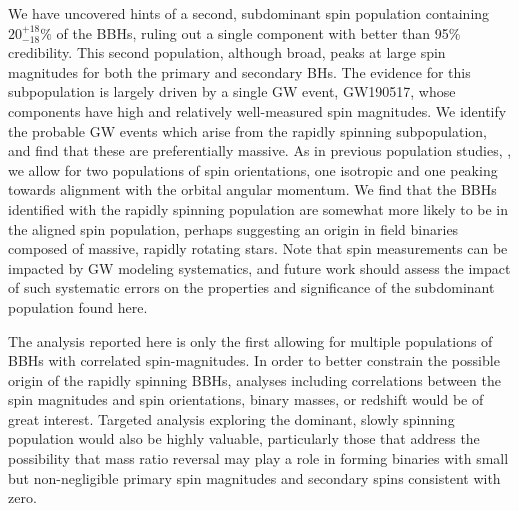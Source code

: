 \documentclass[twocolumn,usenames,dvipsnames,linenumbers]{aastex631}
\newcommand{\rapidspinpercent}{\ensuremath{20^{+18}_{-18} \%}\xspace}
\begin{document}
We have uncovered hints of a second, subdominant spin population containing \rapidspinpercent of the \acp{BBH}, ruling out a single component with better than 95\% credibility.
This second population, although broad, peaks at large spin magnitudes for both the primary and secondary \acp{BH}.
The evidence for this subpopulation is largely driven by a single \ac{GW} event, GW190517, whose components have high and relatively well-measured spin magnitudes.
We identify the probable \ac{GW} events which arise from the rapidly spinning subpopulation, and find that these are preferentially massive.
As in previous population studies, \cite[e.g.][]{KAGRA:2021duu}, we allow for two populations of spin orientations, one isotropic and one peaking towards alignment with the orbital angular momentum.
We find that the \acp{BBH} identified with the rapidly spinning population are somewhat more likely to be in the aligned spin population,
perhaps suggesting an origin in field binaries composed of massive, rapidly rotating stars.
Note that spin measurements can be impacted by \ac{GW} modeling systematics, and future work should assess the impact of such systematic errors on the properties and significance of the subdominant population found here.

The analysis reported here is only the first allowing for multiple populations of \acp{BBH} with correlated spin-magnitudes.
In order to better constrain the possible origin of the rapidly spinning \acp{BBH}, analyses including correlations between the spin magnitudes and spin orientations, binary masses, or redshift would be of great interest.
Targeted analysis exploring the dominant, slowly spinning population would also be highly valuable, particularly those 
that address the possibility that mass ratio reversal may play a role in forming binaries with small but non-negligible 
primary spin magnitudes and secondary spins consistent with zero.
\end{document}
